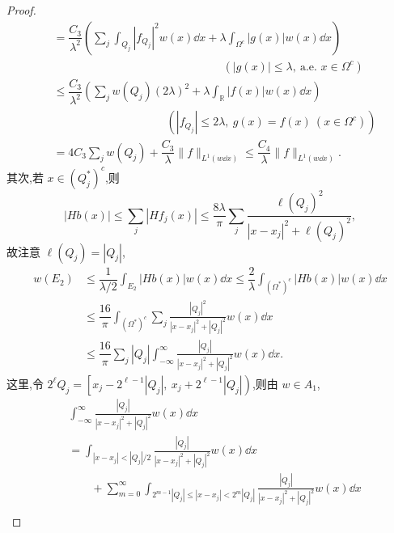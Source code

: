 \begin{proof}
\begin{equation}
\begin{aligned}
&= \dfrac{C_{3}}{\lambda^{2}}\left(\displaystyle\sum_{j}\int_{Q_{j}}|f_{Q_{j}}|^{2}w(x)\dd x + \lambda\int_{\Omega^{c}}|g(x)|w(x)\dd x\right) \\
&\quad \quad \quad \quad \quad \quad \quad \quad \quad \quad \quad \quad \quad \quad \quad (|g(x)| \leq \lambda,\ \text{a.e. } x \in \Omega^{c}) \\
&\leq \dfrac{C_{3}}{\lambda^{2}}\left(\displaystyle\sum_{j}w(Q_{j})(2\lambda)^{2} + \lambda\int_{\mathbb{R}}|f(x)|w(x)\dd x\right) \\
&\quad \quad \quad \quad \quad \quad \quad \quad \quad \quad (|f_{Q_{j}}| \leq 2\lambda,\ g(x) = f(x)\ (x \in \Omega^{c})) \\
&= 4C_{3}\displaystyle\sum_{j}w(Q_{j}) + \dfrac{C_{3}}{\lambda}\| f \|_{L^{1}(w\dd x)} \leq \dfrac{C_{4}}{\lambda}\| f \|_{L^{1}(w\dd x)}.
\end{aligned}\label{eq:1.11.21}\end{equation}
其次,若 $x \in (Q_{j}^{*})^{c}$,则
\begin{equation*}
|Hb(x)| \leq \sum_{j}|Hf_{j}(x)| \leq \frac{8\lambda}{\pi}\sum_{j}\frac{\ell(Q_{j})^{2}}{|x - x_{j}|^{2} + \ell(Q_{j})^{2}},
\end{equation*}
故注意 $\ell(Q_{j}) = |Q_{j}|$,
\begin{equation}\tag{1.11.22}\begin{aligned}
w(E_{2}) &\leq \dfrac{1}{\lambda/2}\displaystyle\int_{E_{2}}|Hb(x)|w(x)\dd x \leq \dfrac{2}{\lambda}\int_{(\Omega^{*})^{c}}|Hb(x)|w(x)\dd x \\
\quad &\leq \dfrac{16}{\pi}\displaystyle\int_{(\Omega^{*})^{c}}\sum_{j}\frac{|Q_{j}|^{2}}{|x - x_{j}|^{2} + |Q_{j}|^{2}}w(x)\dd x \\
\quad &\leq \dfrac{16}{\pi}\displaystyle\sum_{j}|Q_{j}|\int_{-\infty}^{\infty}\frac{|Q_{j}|}{|x - x_{j}|^{2} + |Q_{j}|^{2}}w(x)\dd x.
\end{aligned}\label{eq:1.11.22}\end{equation}
这里,令 $2^{\ell}Q_{j} = \left[x_{j} - 2^{\ell-1}|Q_{j}|,\ x_{j} + 2^{\ell-1}|Q_{j}|\right)$,则由 $w \in A_{1}$,
\begin{align*}
& \displaystyle\int_{-\infty}^{\infty}\frac{|Q_{j}|}{|x - x_{j}|^{2} + |Q_{j}|^{2}}w(x)\dd x \\
& = \displaystyle\int_{|x - x_{j}| < |Q_{j}|/2}\frac{|Q_{j}|}{|x - x_{j}|^{2} + |Q_{j}|^{2}}w(x)\dd x \\
& \qquad + \displaystyle\sum_{m=0}^{\infty}\int_{2^{m-1}|Q_{j}| \leq |x - x_{j}| < 2^{m}|Q_{j}|}\frac{|Q_{j}|}{|x - x_{j}|^{2} + |Q_{j}|^{2}}w(x)\dd x \\

\end{align*}
\end{proof}
